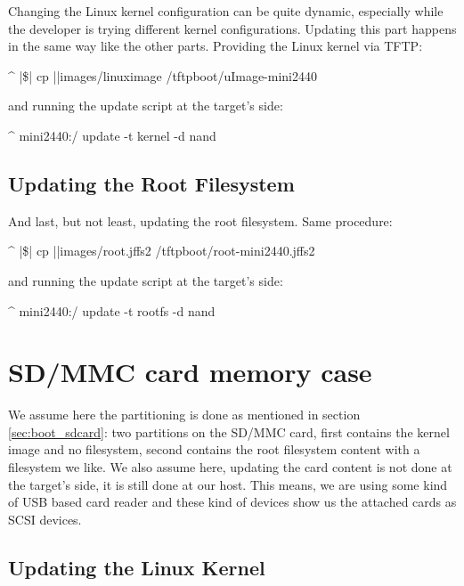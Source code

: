 Changing the Linux kernel configuration can be quite dynamic, especially while
the developer is trying different kernel configurations. Updating this part
happens in the same way like the other parts. Providing the Linux kernel via
TFTP:

\begin{ptxshell}[escapechar=|]{^}
|\$| cp |\ptxdistPlatformDir |images/linuximage /tftpboot/uImage-mini2440
\end{ptxshell}

and running the update script at the target's side:

\begin{ptxshell}[escapechar=|]{^}
mini2440:/ update -t kernel -d nand
\end{ptxshell}

\subsection{Updating the Root Filesystem}

And last, but not least, updating the root filesystem. Same procedure:

\begin{ptxshell}[escapechar=|]{^}
|\$| cp |\ptxdistPlatformDir |images/root.jffs2 /tftpboot/root-mini2440.jffs2
\end{ptxshell}

and running the update script at the target's side:

\begin{ptxshell}[escapechar=|]{^}
mini2440:/ update -t rootfs -d nand
\end{ptxshell}

\section{SD/MMC card memory case}

We assume here the partitioning is done as mentioned in section
\ref{sec:boot_sdcard}: two partitions on the SD/MMC card, first contains the
kernel image and no filesystem, second contains the root filesystem content
with a filesystem we like. We also assume here, updating the card content is
not done at the target's side, it is still done at our host. This means, we are
using some kind of USB based card reader and these kind of devices show us the
attached cards as SCSI devices.

\subsection{Updating the Linux Kernel}

